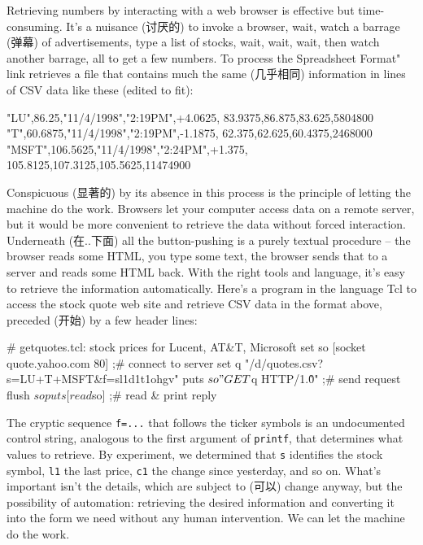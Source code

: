 Retrieving numbers by interacting with a web browser is effective but
time-consuming. It's a nuisance (讨厌的) to invoke a browser, wait, watch a
barrage (弹幕) of advertisements, type a list of stocks, wait, wait, wait,
then watch another barrage, all to get a few numbers. To process the
Spreadsheet Format" link retrieves a file that contains much the same
(几乎相同) information in lines of CSV data like these (edited to fit):
\begin{wellcode}
    "LU",86.25,"11/4/1998","2:19PM",+4.0625,
            83.9375,86.875,83.625,5804800
    "T",60.6875,"11/4/1998","2:19PM",-1.1875,
            62.375,62.625,60.4375,2468000
    "MSFT",106.5625,"11/4/1998","2:24PM",+1.375,
            105.8125,107.3125,105.5625,11474900
\end{wellcode}

Conspicuous (显著的) by its absence in this process is the principle of
letting the machine do the work. Browsers let your computer access data on
a remote server, but it would be more convenient to retrieve the data
without forced interaction. Underneath (在..下面) all the button-pushing is
a purely textual procedure -- the browser reads some HTML, you type some
text, the browser sends that to a server and reads some HTML back. With the
right tools and language, it's easy to retrieve the information
automatically.  Here's a program in the language Tcl to access the stock
quote web site and retrieve CSV data in the format above, preceded (开始)
by a few header lines:
\begin{wellcode}
    # getquotes.tcl: stock prices for Lucent, AT&T, Microsoft
    set so [socket quote.yahoo.com 80]  ;# connect to server
    set q "/d/quotes.csv?s=LU+T+MSFT&f=sl1d1t1ohgv"
    puts $so "GET $q HTTP/1.0\r\n\r\n"  ;# send request
    flush $so
    puts [read $so]                     ;# read & print reply
\end{wellcode}
The cryptic sequence \verb'f=...' that follows the ticker symbols is an
undocumented control string, analogous to the first argument of
\verb'printf', that determines what values to retrieve. By experiment, we
determined that \verb's' identifies the stock symbol, \verb'l1' the last
price, \verb'c1' the change since yesterday, and so on. What's important
isn't the details, which are subject to (可以) change anyway, but the
possibility of automation: retrieving the desired information and
converting it into the form we need without any human intervention. We can
let the machine do the work.

